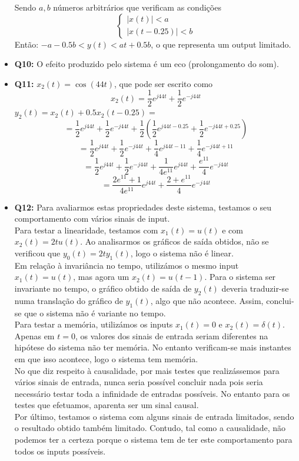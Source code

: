 \documentclass[a4paper, 12pt]{article}
\begin{document}
\begin{itemize}
          Sendo $a, b$ números arbitrários que verificam as condições
          \[\begin{cases}
                  |x(t)| < a \\
                  |x(t - 0.25)| < b
              \end{cases}\]
          Então: $-a - 0.5b < y(t) < at + 0.5b$, o que representa um output limitado.
    \item \textbf{Q10:} O efeito produzido pelo sistema é um eco (prolongamento do som).
    \item \textbf{Q11:} $x_2(t) = \cos(44t)$, que pode ser escrito como
          \[x_2(t) = \frac{1}{2}e^{j44t} + \frac{1}{2}e^{-j44t}\]
          $y_2(t) = x_2(t) + 0.5x_2(t - 0.25) =$
          \[= \frac{1}{2}e^{j44t} + \frac{1}{2}e^{-j44t} + \frac{1}{2}\left(\frac{1}{2}e^{j44t - 0.25}+\frac{1}{2}e^{-j44t + 0.25}\right)\]
          \[= \frac{1}{2}e^{j44t} + \frac{1}{2}e^{-j44t} + \frac{1}{4}e^{j44t - 11} + \frac{1}{4}e^{-j44t + 11}\]
          \[= \frac{1}{2}e^{j44t} + \frac{1}{2}e^{-j44t} + \frac{1}{4e^{11}}e^{j44t} + \frac{e^{11}}{4}e^{-j44t}\]
          \[= \frac{2e^{11} + 1}{4e^{11}}e^{j44t} + \frac{2+e^{11}}{4}e^{-j44t}\]
          \newpage
    \item \textbf{Q12:} Para avaliarmos estas propriedades deste sistema, testamos o seu comportamento com vários sinais de input.\vspace{10px}\\
          Para testar a linearidade, testamos com $x_1(t) = u(t)$ e com $x_2(t) = 2tu(t)$. Ao analisarmos os gráficos de saída obtidos, não se verificou que $y_0(t) = 2ty_1(t)$, logo o sistema não é linear.\vspace{10px}\\
          Em relação à invariância no tempo, utilizámos o mesmo input $x_1(t) = u(t)$, mas agora um $x_2(t) = u(t - 1)$. Para o sistema ser invariante no tempo, o gráfico obtido de saída de $y_2(t)$ deveria traduzir-se numa translação do gráfico de $y_1(t)$, algo que não acontece. Assim, conclui-se que o sistema não é variante no tempo.\vspace{10px}\\
          Para testar a memória, utilizámos os inputs $x_1(t) = 0$ e $x_2(t) = \delta(t)$. Apenas em $t = 0$, os valores dos sinais de entrada seriam diferentes na hipótese do sistema não ter memória. No entanto verificam-se mais instantes em que isso acontece, logo o sistema tem memória.\vspace{10px}\\
          No que diz respeito à causalidade, por mais testes que realizássemos para vários sinais de entrada, nunca seria possível concluir nada pois seria necessário testar toda a infinidade de entradas possíveis. No entanto para os testes que efetuamos, aparenta ser um sinal causal.\vspace{10px}\\
          Por último, testamos o sistema com alguns sinais de entrada limitados, sendo o resultado obtido também limitado. Contudo, tal como a causalidade, não podemos ter a certeza porque o sistema tem de ter este comportamento para todos os inputs possíveis.
\end{itemize}
\newpage
\end{document}
